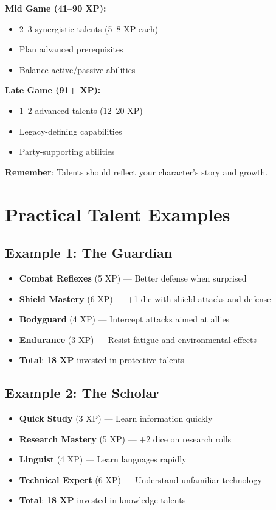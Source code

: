 \begin{multicols}{2}
\begin{tcolorbox}[colback=purple!5!white,colframe=purple!75!black,title=Talent Selection Guide,fonttitle=\bfseries]
\textbf{Mid Game (41--90 XP):}
\begin{itemize}
\item 2--3 synergistic talents (5--8 XP each)
\item Plan advanced prerequisites
\item Balance active/passive abilities
\end{itemize}

\textbf{Late Game (91+ XP):}
\begin{itemize}
\item 1--2 advanced talents (12--20 XP)
\item Legacy-defining capabilities
\item Party-supporting abilities
\end{itemize}

\textbf{Remember}: Talents should reflect your character's story and growth.
\end{tcolorbox}

\section{Practical Talent Examples}

\subsection*{Example 1: The Guardian}
\begin{itemize}
\item \textbf{Combat Reflexes} (5 XP) --- Better defense when surprised
\item \textbf{Shield Mastery} (6 XP) --- +1 die with shield attacks and defense
\item \textbf{Bodyguard} (4 XP) --- Intercept attacks aimed at allies
\item \textbf{Endurance} (3 XP) --- Resist fatigue and environmental effects
\item \textbf{Total}: \textbf{18 XP} invested in protective talents
\end{itemize}

\subsection*{Example 2: The Scholar}
\begin{itemize}
\item \textbf{Quick Study} (3 XP) --- Learn information quickly
\item \textbf{Research Mastery} (5 XP) --- +2 dice on research rolls
\item \textbf{Linguist} (4 XP) --- Learn languages rapidly
\item \textbf{Technical Expert} (6 XP) --- Understand unfamiliar technology
\item \textbf{Total}: \textbf{18 XP} invested in knowledge talents
\end{itemize}


\end{multicols}
